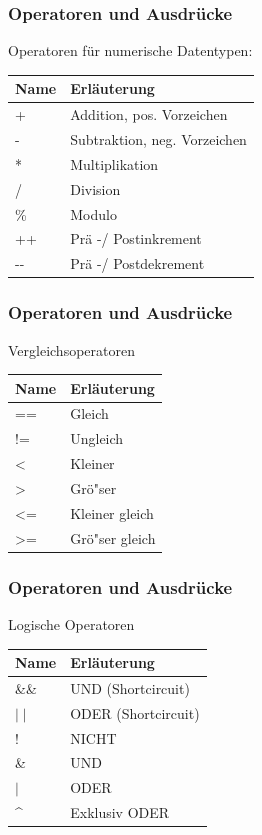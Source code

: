 \begin{frame}[fragile]
	\frametitle{Operatoren und Ausdr\"ucke}
	Operatoren f\"ur numerische Datentypen:
	\begin{table}
	\begin{tabular}{l|l}
	Name & Erl\"auterung \\ \hline
	+ & Addition, pos. Vorzeichen \\
			- & Subtraktion, neg. Vorzeichen \\
			* & Multiplikation \\
			/ & Division \\
			\% & Modulo \\
			++ & Pr\"a -/ Postinkrement \\
			-{}- & Pr\"a -/ Postdekrement \\
	\end{tabular}
	\end{table}
\end{frame}

\begin{frame}[fragile]
	\frametitle{Operatoren und Ausdr\"ucke}
	Vergleichsoperatoren
	\begin{table}
		\begin{tabular}{l|l}
			Name & Erl\"auterung  \\ \hline
			== & Gleich \\
			!= & Ungleich \\
			\textless & Kleiner \\
			\textgreater & Gr\"o"ser \\
			\textless= & Kleiner gleich \\
			\textgreater= & Gr\"o"ser gleich \\
		\end{tabular}
	\end{table}
\end{frame}

\begin{frame}[fragile]
	\frametitle{Operatoren und Ausdr\"ucke}
	Logische Operatoren
	\begin{table}
		\begin{tabular}{l|l}
			Name & Erl\"auterung  \\ \hline
			\&\&  & UND (Shortcircuit) \\
			$\mid\mid$ & ODER (Shortcircuit) \\
			! & NICHT \\
			\& & UND \\
			$\mid$ & ODER \\
			\textasciicircum & Exklusiv ODER \\
		\end{tabular}
	\end{table}
\end{frame}

